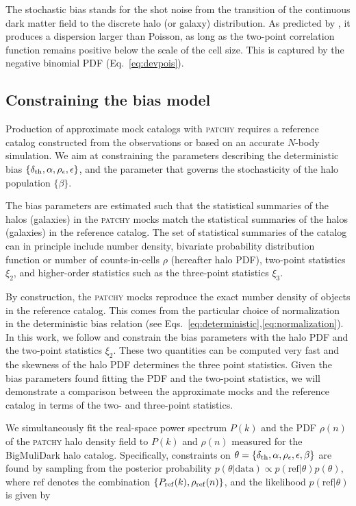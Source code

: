 \documentclass[english,usenatbib]{mn2e}
\begin{document}
The stochastic bias stands for the shot noise from the transition of the continuous dark matter field to the discrete halo (or galaxy) distribution. As predicted by \citet{Peebles1980}, it produces a dispersion larger than Poisson, as long as the two-point correlation function remains positive below the scale of the cell size. This is captured by the negative binomial PDF (Eq.~\ref{eq:devpois}).

\subsection{Constraining the bias model}
\label{sec:mcmc}

Production of approximate mock catalogs with \textsc{patchy} requires a reference catalog constructed from the observations or based on an accurate $N$-body simulation. 
We aim at constraining the parameters describing the deterministic bias $\{\delta_{\rm th},\alpha, \rho_{\epsilon},\epsilon\}$, and the parameter that governs the stochasticity of the halo population $\{\beta\}$.

The bias parameters are estimated such that the statistical summaries of the halos (galaxies) in the \textsc{patchy} mocks match the statistical summaries of the halos (galaxies) in the reference catalog. The set of statistical summaries of the catalog can in principle include number density, bivariate probability distribution function or number of counts-in-cells $\rho$ (hereafter halo PDF), two-point statistics $\xi_{2}$, and higher-order statistics such as the three-point statistics $\xi_{3}$. 

By construction, the \textsc{patchy} mocks reproduce the exact number density of objects in the reference catalog. This comes from the particular choice of normalization in the deterministic bias relation (see Eqs.~\ref{eq:deterministic},\ref{eq:normalization}). In this work, we follow \citet{kitaura2015} and constrain the bias parameters with the halo PDF and the two-point statistics $\xi_{2}$. These two quantities can be computed very fast and the skewness of the halo PDF determines the three point statistics. Given the bias parameters found fitting the PDF and the two-point statistics, we will demonstrate a comparison between the approximate mocks and the reference catalog in terms of the two- and three-point statistics. 

We simultaneously fit the real-space power spectrum $P(k)$ and the PDF $\rho(n)$ of the \textsc{patchy} halo density field to $P(k)$ and $\rho(n)$ measured for the BigMuliDark halo catalog. Specifically, constraints on $\theta = \{\delta_{\rm th},\alpha, \rho_{\epsilon},\epsilon, \beta\}$ are found by sampling from the posterior probability $p(\theta|\mathrm{data}) \propto p(\mathrm{ref}|\theta)p(\theta)$, where $\mathrm{ref}$ denotes the combination $\{P_{\rm ref} (k), \rho_{\rm ref}(n)\}$, and the likelihood $p(\mathrm{ref}|\theta)$ is given by
\end{document}
